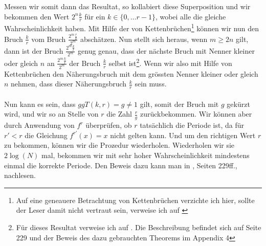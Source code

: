 Messen wir somit dann das Resultat, so kollabiert diese Superposition und wir bekommen den Wert $2^n\frac{k}{r}$ für ein $k \in \{0, \dots r - 1\}$, wobei alle die gleiche Wahrscheinlichkeit haben. Mit Hilfe der von Kettenbrüchen\footnote{Auf eine geneauere Betrachtung von Kettenbrüchen verzichte ich hier, sollte der Leser damit nicht vertraut sein, verweise ich auf \cite{Frac}} können wir nun den Bruch $\frac{k}{r}$ vom Bruch $\frac{2^m\frac{r}{k}}{2^m}$ abschätzen. Nun stellt sich heraus, wenn $m \geq 2n$ gilt, dann ist der Bruch $\frac{2^m\frac{k}{r}}{2^m}$ genug genau, dass der nächste Bruch mit Nenner kleiner oder gleich $n$ an $\frac{2^m\frac{k}{r}}{2^m}$ der Bruch $\frac{k}{r}$ selbst ist\footnote{Für dieses Resultat verweise ich auf \cite{QC}. Die Beschreibung befindet sich auf Seite 229 und der Beweis des dazu gebrauchten Theorems im Appendix 4}. Wenn wir also mit Hilfe von Kettenbrüchen den Näherungsbruch mit dem grössten Nenner kleiner oder gleich $n$ nehmen, dass dieser Näherungsbruch $\frac{k}{r}$ sein muss.
\paragraph{}
Nun kann es sein, dass $ggT(k, r) = g \neq 1$ gilt, somit der Bruch mit $g$ gekürzt wird, und wir so an Stelle von $r$ die Zahl $\frac{r}{g}$ zurückbekommen. Wir können aber durch Anwendung von $f^r$ überprüfen, ob $r$ tatsächlich die Periode ist, da für $r' < r$ die Gleichung $f^{r'}(x) = x$ nicht gelten kann. Und um den richtigen Wert $r$ zu bekommen, können wir die Prozedur wiederholen. Wiederholen wir sie $2\log(N)$ mal, bekommen wir mit sehr hoher Wahrscheinlichkeit mindestens einmal die korrekte Periode. Den Beweis dazu kann man in \cite{QC}, Seiten 229ff., nachlesen.

